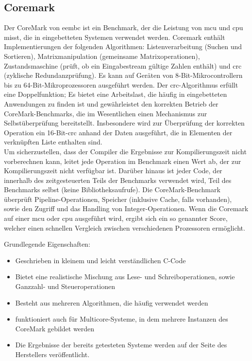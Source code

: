   \subsection{Coremark}\label{kap:coremark}
  Der CoreMark von \ac{eembc} ist ein Benchmark, der die Leistung von \ac{mcu} und \ac{cpu} misst, die in eingebetteten Systemen verwendet werden.
   Coremark enthält Implementierungen der folgenden Algorithmen: Listenverarbeitung (Suchen und Sortieren),
    Matrixmanipulation (gemeinsame Matrixoperationen), Zustandsmaschine (prüft, ob ein Eingabestream gültige Zahlen enthält) und \ac{crc} (zyklische Redundanzprüfung).
    Es kann auf Geräten von 8-Bit-Mikrocontrollern bis zu 64-Bit-Mikroprozessoren ausgeführt werden.
  Der \ac{crc}-Algorithmus erfüllt eine Doppelfunktion; Es bietet eine Arbeitslast, die häufig in eingebetteten Anwendungen zu finden ist
  und gewährleistet den korrekten Betrieb der CoreMark-Benchmarks, die im Wesentlichen einen Mechanismus zur Selbstüberprüfung bereitstellt.
   Insbesondere wird zur Überprüfung der korrekten Operation ein 16-Bit-\ac{crc} anhand der Daten ausgeführt, die in Elementen der verknüpften Liste enthalten sind.\\
  Um sicherzustellen, dass der Compiler die Ergebnisse zur Kompilierungszeit nicht vorberechnen kann, leitet jede Operation im Benchmark einen Wert ab,
  der zur Kompilierungszeit nicht verfügbar ist. Darüber hinaus ist jeder Code, der innerhalb des zeitgesteuerten Teils der Benchmarks verwendet wird,
  Teil des Benchmarks selbst (keine Bibliotheksaufrufe).
  Die CoreMark-Benchmark überprüft Pipeline-Operationen, Speicher (inklusive Cache, falls vorhanden), sowie den Zugriff und das Handling von Integer-Operationen.
  Wenn die Coremark auf einer \ac{mcu} oder \ac{cpu} ausgeführt wird, ergibt sich ein so genannter Score, welcher einen schnellen Vergleich zwischen verschiedenen Prozessoren ermöglicht.~\cite{coremark}


  Grundlegende Eigenschaften:
\begin{itemize}
  \item Geschrieben in kleinem und leicht verständlichen C-Code
  \item Bietet eine realistische Mischung aus Lese- und Schreiboperationen, sowie Ganzzahl- und Steueroperationen
  \item Besteht aus mehreren Algorithmen, die häufig verwendet werden
  \item funktioniert auch für Multicore-Systeme, in dem mehrere Instanzen des CoreMark gebildet werden
  \item Die Ergebnisse der bereits getesteten Systeme werden auf der Seite des Herstellers veröffentlicht.
\end{itemize}

